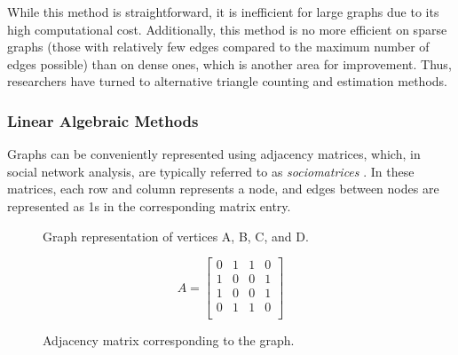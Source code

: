 \documentclass[12pt]{article}
\begin{document}
While this method is straightforward, it is inefficient for large graphs due to its high computational cost.
Additionally, this method is no more efficient on sparse graphs (those with relatively few edges compared to the maximum number of edges possible) than on dense ones, which is another area for improvement.
Thus, researchers have turned to alternative triangle counting and estimation methods.

\subsubsection{Linear Algebraic Methods}

Graphs can be conveniently represented using adjacency matrices, which, in social network analysis, are typically referred to as \emph{sociomatrices} \cite{beum_method_1950}. 
In these matrices, each row and column represents a node, and edges between nodes are represented as 1s in the corresponding matrix entry.

\begin{figure}[H]
    \centering
    \begin{minipage}{0.45\textwidth}
        \caption{Graph representation of vertices A, B, C, and D.}
    \end{minipage}%
    \hfill
    \begin{minipage}{0.45\textwidth}
        \[
        A =
        \begin{bmatrix}
        0 & 1 & 1 & 0 \\
        1 & 0 & 0 & 1 \\
        1 & 0 & 0 & 1 \\
        0 & 1 & 1 & 0 \\
        \end{bmatrix}
        \]
        \caption{Adjacency matrix corresponding to the graph.}
    \end{minipage}
\end{figure}
\end{document}
